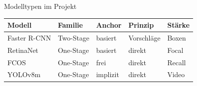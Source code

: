 \begin{frame}{Modelltypen  im Projekt}
\scriptsize
\begin{tabular}{l l l l l}
\toprule
Modell & Familie & Anchor & Prinzip & Stärke \\
\midrule
Faster R-CNN \cite{Ren2015FasterRCNN} & Two-Stage & basiert & Vorschläge & Boxen \\
RetinaNet \cite{Lin2017FocalLoss} & One-Stage & basiert & direkt & Focal \\
FCOS \cite{Tian2019FCOS} & One-Stage & frei & direkt & Recall \\
YOLOv8m \cite{Yaseen2024YOLOv8} & One-Stage & implizit & direkt & Video \\
\bottomrule
\end{tabular}
\end{frame}
